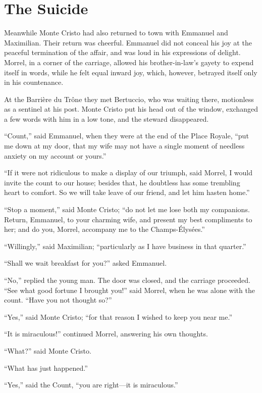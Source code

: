\chapter{The Suicide}

Meanwhile Monte Cristo had also returned to town with Emmanuel and
Maximilian. Their return was cheerful. Emmanuel did not conceal his joy
at the peaceful termination of the affair, and was loud in his
expressions of delight. Morrel, in a corner of the carriage, allowed
his brother-in-law’s gayety to expend itself in words, while he felt
equal inward joy, which, however, betrayed itself only in his
countenance.

At the Barrière du Trône they met Bertuccio, who was waiting there,
motionless as a sentinel at his post. Monte Cristo put his head out of
the window, exchanged a few words with him in a low tone, and the
steward disappeared.

“Count,” said Emmanuel, when they were at the end of the Place Royale,
“put me down at my door, that my wife may not have a single moment of
needless anxiety on my account or yours.”

“If it were not ridiculous to make a display of our triumph, said
Morrel, I would invite the count to our house; besides that, he
doubtless has some trembling heart to comfort. So we will take leave of
our friend, and let him hasten home.”

“Stop a moment,” said Monte Cristo; “do not let me lose both my
companions. Return, Emmanuel, to your charming wife, and present my
best compliments to her; and do you, Morrel, accompany me to the
Champs-Élysées.”

“Willingly,” said Maximilian; “particularly as I have business in that
quarter.”

“Shall we wait breakfast for you?” asked Emmanuel.

“No,” replied the young man. The door was closed, and the carriage
proceeded. “See what good fortune I brought you!” said Morrel, when he
was alone with the count. “Have you not thought so?”

“Yes,” said Monte Cristo; “for that reason I wished to keep you near
me.”

“It is miraculous!” continued Morrel, answering his own thoughts.

“What?” said Monte Cristo.

“What has just happened.”

“Yes,” said the Count, “you are right—it is miraculous.”

